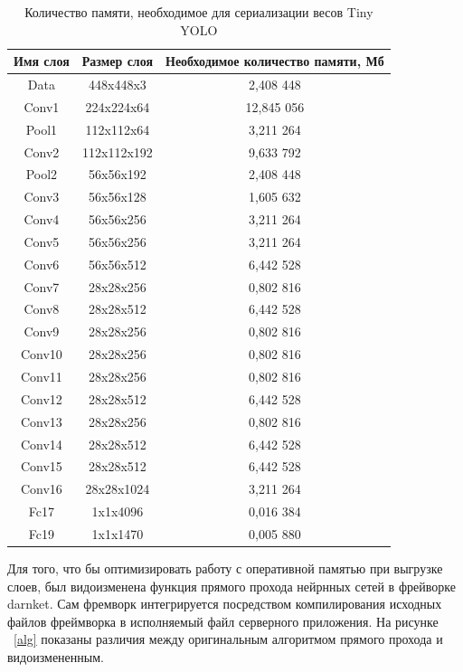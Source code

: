 \documentclass[a4paper,english,russian]{G2-105}
\begin{document}
\begin{longtable}{|c|c|c|}
    \caption{Количество памяти, необходимое для сериализации весов Tiny YOLO} \label{mbtable} \\ \hline
    Имя слоя        & Размер слоя        &    Необходимое количество памяти, Мб \\ \hline \endhead
    Data           & 448x448x3 & 2,408 448 \\ \hline
    Conv1           & 224x224x64 & 12,845 056 \\ \hline
    Pool1           & 112x112x64 & 3,211 264 \\ \hline
    Conv2           & 112x112x192 & 9,633 792 \\ \hline
    Pool2           & 56x56x192 & 2,408 448 \\ \hline
    Conv3           & 56x56x128 & 1,605 632 \\ \hline
    Conv4           & 56x56x256 & 3,211 264 \\ \hline
    Conv5           & 56x56x256 & 3,211 264 \\ \hline
    Conv6           & 56x56x512 & 6,442 528 \\ \hline
    Conv7           & 28x28x256 & 0,802 816 \\ \hline
    Conv8           & 28x28x512 & 6,442 528 \\ \hline
    Conv9           & 28x28x256 & 0,802 816 \\ \hline
    Conv10           & 28x28x256 & 0,802 816 \\ \hline
    Conv11           & 28x28x256 & 0,802 816 \\ \hline
    Conv12           & 28x28x512 & 6,442 528 \\ \hline
    Conv13           & 28x28x256 & 0,802 816 \\ \hline
    Conv14           & 28x28x512 & 6,442 528 \\ \hline
    Conv15           & 28x28x512 & 6,442 528 \\ \hline
    Conv16           & 28x28x1024 & 3,211 264 \\ \hline
    Fc17           & 1x1x4096 & 0,016 384 \\ \hline
    Fc19           & 1x1x1470 & 0,005 880 \\
\end{longtable}
\par Для того, что бы оптимизировать работу с оперативной памятью при выгрузке слоев, был видоизменена функция прямого прохода нейрнных сетей в фрейворке darnket. Сам фремворк интегрируется посредством компилирования исходных файлов фреймворка в исполняемый файл серверного приложения. На рисунке ~\ref{alg} показаны различия между оригинальным алгоритмом прямого прохода и видоизмененным.
\end{document}
